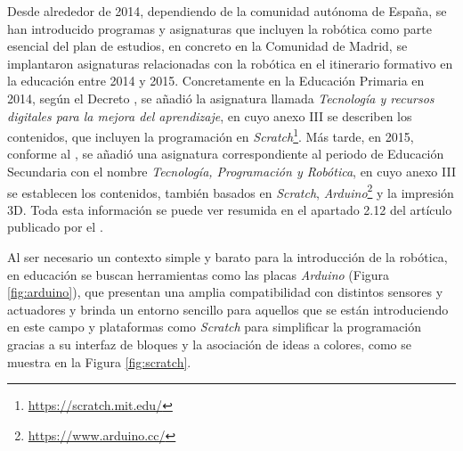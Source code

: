 Desde alrededor de 2014, dependiendo de la comunidad autónoma de España, se han
introducido programas y asignaturas que incluyen la robótica como parte esencial
del plan de estudios, en concreto en la Comunidad de Madrid, se implantaron
asignaturas relacionadas con la robótica en el itinerario formativo en la
educación entre 2014 y 2015.
Concretamente en la Educación Primaria en 2014, según el Decreto
\cite{Decreto2014}, se añadió la asignatura llamada \textit{Tecnología y
recursos digitales para la mejora del aprendizaje}, en cuyo anexo III se
describen los contenidos, que incluyen la programación en
\textit{Scratch}\footnote{\url{https://scratch.mit.edu/}}.
Más tarde, en 2015, conforme al \cite{Decreto2015}, se añadió una
asignatura correspondiente al periodo de Educación Secundaria con el nombre
\textit{Tecnología, Programación y Robótica}, en cuyo anexo III se establecen
los contenidos, también basados en \textit{Scratch},
\textit{Arduino}\footnote{\url{https://www.arduino.cc/}} y la impresión 3D.
Toda esta información se puede ver resumida en el apartado 2.12 del artículo
publicado por el \cite{EducacionRob}.

Al ser necesario un contexto simple y barato para la introducción de la
robótica, en educación se buscan herramientas como las placas \textit{Arduino}
(Figura \ref{fig:arduino}), que presentan una amplia compatibilidad con
distintos sensores y actuadores y brinda un entorno sencillo para aquellos que
se están introduciendo en este campo y plataformas como \textit{Scratch} para
simplificar la programación gracias a su interfaz de bloques y la asociación de
ideas a colores, como se muestra en la Figura \ref{fig:scratch}.

